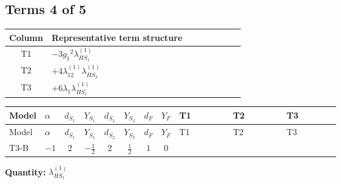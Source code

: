 \documentclass[8pt]{article}
\begin{document}
\begin{landscape}
\subsection*{Terms 4 of 5}
\begin{center}
\begin{tabular}{@{}c >{\raggedright\arraybackslash}p{0.82\linewidth}@{}}
\toprule
Column & Representative term structure \\
\midrule
T1 & \(\displaystyle -3 {g_1}^2 {\lambda_{HS_1}^{(1)}}\) \\
\midrule
T2 & \(\displaystyle +4 {\lambda_{12}^{(1)}} {\lambda_{HS_2}^{(1)}}\) \\
\midrule
T3 & \(\displaystyle +6 {\lambda_1} {\lambda_{HS_1}^{(1)}}\) \\
\midrule
\bottomrule
\end{tabular}
\end{center}
\smallskip
\tiny
\begin{longtable}{@{}llcccccc >{\raggedright\arraybackslash}p{0.21\linewidth} >{\raggedright\arraybackslash}p{0.21\linewidth} >{\raggedright\arraybackslash}p{0.21\linewidth}@{}}
\toprule
Model & $\alpha$ & $d_{S_1}$ & $Y_{S_1}$ & $d_{S_2}$ & $Y_{S_2}$ & $d_F$ & $Y_F$ & T1 & T2 & T3 \\
\midrule
\endfirsthead
\toprule
Model & $\alpha$ & $d_{S_1}$ & $Y_{S_1}$ & $d_{S_2}$ & $Y_{S_2}$ & $d_F$ & $Y_F$ & T1 & T2 & T3 \\
\midrule
\endhead
T3-B & $-1$ & $2$ & $-\frac{1}{2}$ & $2$ & $\frac{1}{2}$ & $1$ & $0$ & \scriptsize\adjustbox{max width=\linewidth}{$\begin{gathered} -3 {g_1}^2 {\lambda_{HS_1}^{(1)}}\end{gathered}$} & \scriptsize\adjustbox{max width=\linewidth}{$\begin{gathered} +4 {\lambda_{12}^{(1)}} {\lambda_{HS_2}^{(1)}}\end{gathered}$} & \scriptsize\adjustbox{max width=\linewidth}{$\begin{gathered} +6 {\lambda_1} {\lambda_{HS_1}^{(1)}}\end{gathered}$} \\
\midrule
\bottomrule
\end{longtable}
\clearpage
\noindent\textbf{Quantity: }$\lambda_{HS_1}^{(1)}$\par\smallskip

\end{landscape}
\end{document}
